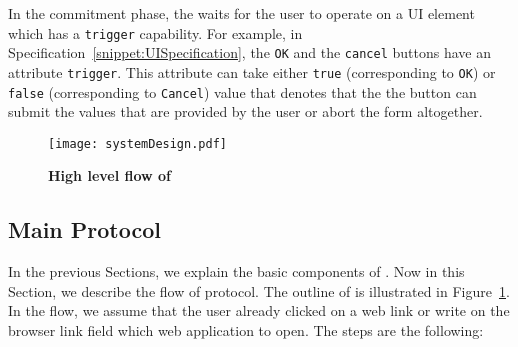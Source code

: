  In the commitment phase, the \device waits for the user to operate on a UI element which has a \texttt{trigger} capability. For example, in Specification~\ref{snippet:UISpecification}, the \texttt{OK} and the \texttt{cancel} buttons have an attribute \texttt{trigger}. This attribute can take either \texttt{true} (corresponding to \texttt{OK}) or \texttt{false} (corresponding to \texttt{Cancel}) value that denotes that the the button can submit the values that are provided by the user or abort the form altogether.  

\begin{figure}[t]
\centering
\texttt{[image: systemDesign.pdf]}
\caption{\textbf{High level flow of \name}}
\label{fig:systemDesign}
\centering
\end{figure}

\subsection{Main Protocol}
\label{sec:systemDesign:mainProtocol}

In the previous Sections, we explain the basic components of \name. Now in this Section, we describe the flow of \name protocol. The outline of \name is illustrated in Figure~\ref{fig:systemDesign}. In the flow, we assume that the user already clicked on a web link or write on the browser link field which web application to open. The steps are the following:


